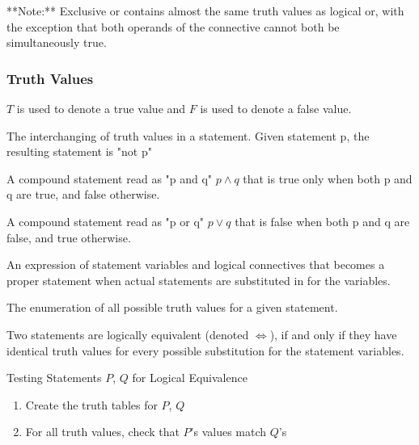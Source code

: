 \documentclass[11pt]{article}
\begin{document}
**Note:** Exclusive or contains almost the same truth values as logical or, with the exception
that both operands of the connective cannot both be simultaneously true.
\starOFF

\subsubsection{Truth Values}

$T$ is used to denote a true value and $F$ is used to denote a false value.

\begin{definition}[Negation]\label{def:negation}
    The interchanging of truth values in a statement.
    Given statement p, the resulting statement is "not p"
\end{definition}

\begin{definition}[Conjunction]\label{def:conjunction}
    A compound statement read as "p and q" $p \land q$ that 
    is true only when both p and q are true, and false otherwise.
\end{definition}

\begin{definition}[Disjunction]\label{def:disjunction}
    A compound statement read as "p or q" $p \lor q$
    that is false when both p and q are false, and true otherwise.
\end{definition}

\begin{definition}\label{def:statement-form}
    An expression of statement variables
    and logical connectives that becomes a proper statement
    when actual statements are substituted in for the variables.
\end{definition}

\begin{definition}\label{def:truth-table}
    The enumeration of all possible truth values for a given statement.
\end{definition}

\begin{definition}\label{def:logical-eq}
    Two statements are logically equivalent (denoted $\iff$),
    if and only if they have identical truth values
    for every possible substitution for the statement variables. 
\end{definition}

\large{Testing Statements $P$, $Q$ for Logical Equivalence}
\begin{enumerate}
    \item Create the truth tables for $P$, $Q$
    \item For all truth values, check that $P$'s values match $Q$'s
\end{enumerate}
\end{document}
